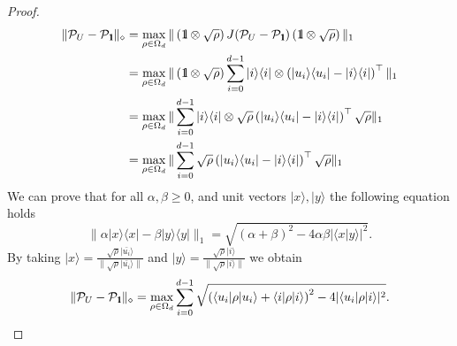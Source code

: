 \documentclass[preprint,12pt, a4paper]{elsarticle}
\newcommand{\ket}[1]{\ensuremath{|#1\rangle}}
\newcommand{\bra}[1]{\ensuremath{\langle#1|}}
\newcommand{\ketbra}[2]{\ensuremath{\ket{#1}\bra{#2}}}
\newcommand{\proj}[1]{\ensuremath{\ketbra{#1}{#1}}}
\newcommand{\braket}[2]{\ensuremath{\langle{#1}|{#2}\rangle}}
\newcommand{\1}{{\rm 1\hspace{-0.9mm}l}}
\newcommand{\Id}{{\rm 1\hspace{-0.9mm}l}}
\newcommand{\PP}{\mathcal{P}}
\begin{document}
\begin{proof}
	
	\begin{equation}
	\begin{split}
	\| \PP_{U} - \PP_{\Id}  \|_\diamond & =  \max_{\rho \in \Omega_d} \| \left( \Id \otimes \sqrt{\rho} \right) J(\PP_{U} - \PP_{\Id} )  \left( \Id \otimes \sqrt{\rho} \right)  \|_1   \\ & =  \max_{\rho \in \Omega_d} \| \left( \Id \otimes \sqrt{\rho} \right) \sum_{i=0}^{d-1} \proj{i} \otimes \left( \proj{u_i} - \proj{i} \right)^\top  \|_1  \\ & = \max_{\rho \in \Omega_d} \| \sum_{i=0}^{d-1} \proj{i} \otimes \sqrt{\rho}  \left( \proj{u_i} - \proj{i} \right)^\top \sqrt{\rho}  \|_1  \\ & = 
	 \max_{\rho \in \Omega_d} \| \sum_{i=0}^{d-1}\sqrt{\rho}  \left( \proj{u_i} - \proj{i} \right)^\top \sqrt{\rho}  \|_1
	\end{split}
	\end{equation}
	We can prove that for all $\alpha, \beta \ge 0 $, and unit vectors $\ket{x}, \ket{y}$ the following equation holds 
	\begin{equation}
	\| \alpha \proj{x} - \beta\proj{y} \|_1 = \sqrt{(\alpha + \beta)^2 - 4\alpha \beta |\braket{x}{y}|^2}.
	\end{equation}
	By taking $\ket{x} = \frac{\sqrt{\rho} \ket{\bar{u_i}}}{\| \sqrt{\rho} \ket{\bar{u_i}} \|}$ and $ \ket{y} = \frac{\sqrt{\rho} \ket{i}}{\|\sqrt{\rho} \ket{i} \|}$ we obtain 
	\begin{equation}
		\| \PP_{U} - \PP_{\Id}  \|_\diamond  = \max_{\rho \in \Omega_d} \sum_{i=0}^{d-1} \sqrt{\left( \bra{u_i} \rho \ket{u_i} + \bra{i} \rho \ket{i }\right)^2 - 4 | \bra{u_i} \rho \ket{i} |^2}.
	\end{equation}
	

\end{proof}
\end{document}
